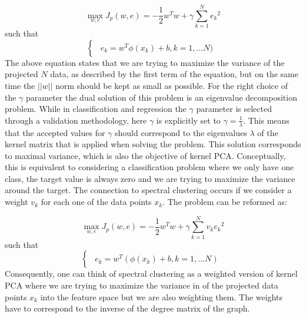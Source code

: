 \documentclass[conference,compsoc]{IEEEtran}
\begin{document}
\begin{equation}
\max\limits_{w,e} J_p(w,e) = -\frac{1}{2}w^Tw + \gamma \sum_{k=1}^{N}{e_k}^2
\end{equation}
such that
\begin{equation*}
\begin{cases}
\begin{aligned}
 e_k = w^T\phi(x_k)+b,k=1,...N)
\end{aligned}
\end{cases}
\end{equation*}
The above equation states that we are trying to maximize the variance of the projected $N$ data, as described by the first term of the equation, but on the same time the $||w||$ norm should be kept as small as possible. For the right choice of the $\gamma$ parameter the dual solution of this problem is an eigenvalue decomposition problem. While in classification and regression the $\gamma$ parameter is selected through a validation methodology, here $\gamma$ is explicitly set to $\gamma=\frac{1}{\lambda}$. This means that the accepted values for $\gamma$ should correspond to the eigenvalues $\lambda$ of the kernel matrix that is applied when solving the problem. This solution corresponds to maximal variance, which is also the objective of kernel PCA. Conceptually, this is equivalent to considering a classification problem where we only have one class, the target value is always zero and we are trying to maximize the variance around the target. The connection to spectral clustering occurs if we consider a weight $v_k$ for each one of the data points $x_k$. The problem can be reformed as:

\begin{equation}
\max\limits_{w,e} J_p(w,e) = -\frac{1}{2}w^Tw + \gamma \sum_{k=1}^{N}v_k{e_k}^2
\end{equation}
such that
\begin{equation*}
\begin{cases}
\begin{aligned}
 e_k = w^T(\phi(x_k)+b,k=1,...N)
\end{aligned}
\end{cases}
\end{equation*}
Consequently, one can think of spectral clustering as a weighted version of kernel PCA where we are trying to maximize the variance in of the projected data points $x_k$ into the feature space but we are also weighting them. The weights have to correspond to the inverse of the degree matrix of the graph.
\end{document}
